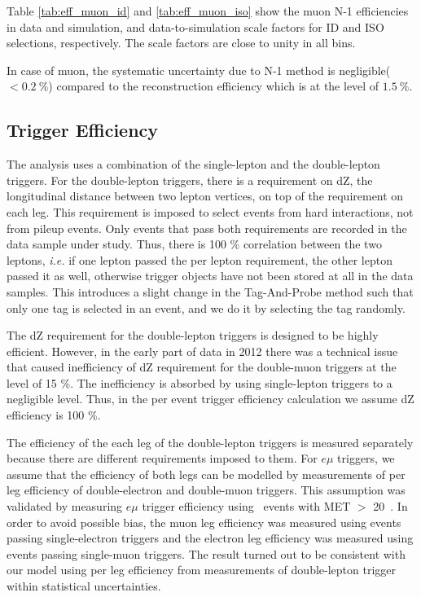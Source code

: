 Table \ref{tab:eff_muon_id} and \ref{tab:eff_muon_iso} show the muon N-1 efficiencies in 
data and simulation, and data-to-simulation scale factors for ID and ISO selections, respectively. 
The scale factors are close to unity in all bins. 

In case of muon, the systematic uncertainty due to N-1 method is negligible($<0.2~\%$)
compared to the reconstruction efficiency which is at the level of $1.5~\%$. 

\subsection{Trigger Efficiency}
\label{subsec:trg_eff}

The analysis uses a combination of the single-lepton and the double-lepton triggers.
For the double-lepton triggers, there is a requirement on dZ, the longitudinal distance 
between two lepton vertices, on top of the requirement on each leg. 
This requirement is imposed to select events from hard interactions, not 
from pileup events.
Only events that pass both requirements are recorded in the data sample under study. 
Thus, there is 100 \% correlation between the two leptons, \textit{i.e.} 
if one lepton passed the per lepton requirement, the other lepton passed it as well, 
otherwise trigger objects have not been stored at all in the data samples.  
This introduces a slight change in the Tag-And-Probe method such that only one 
tag is selected in an event, and we do it by selecting the tag randomly.

The dZ requirement for the double-lepton triggers is designed to be highly efficient. 
However, in the early part of data in 2012 there was a technical issue that 
caused inefficiency of dZ requirement for the double-muon triggers at the level of 15 \%.   
The inefficiency is absorbed by using single-lepton triggers to a negligible level. 
Thus, in the per event trigger efficiency calculation we assume dZ efficiency is 100 \%.

The efficiency of the each leg of the double-lepton triggers is measured separately 
because there are different requirements imposed to them. For $e\mu$ triggers, 
we assume that the efficiency of both legs can be modelled by measurements 
of per leg efficiency of double-electron and double-muon triggers.%
This assumption was validated by measuring $e\mu$ trigger efficiency 
using \Top\Atop~events with MET $>$ 20~\GeV. In order to avoid possible bias,
the muon leg efficiency was measured using events passing single-electron triggers
and the electron leg efficiency was measured using events passing single-muon triggers.
The result turned out to be consistent with our model using per leg efficiency
from measurements of double-lepton trigger within statistical uncertainties. 

